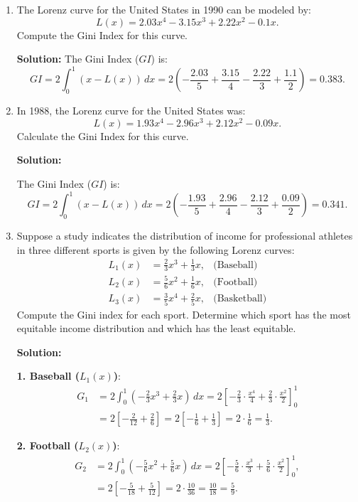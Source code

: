 \documentclass{article}
\begin{document}
\begin{enumerate}[leftmargin=0.5cm, label=\arabic*., rightmargin=0.2cm]

    \item The Lorenz curve for the United States in 1990 can be modeled by:
    \[
    L(x) = 2.03x^4 - 3.15x^3 + 2.22x^2 - 0.1x.
    \]
    Compute the Gini Index for this curve.

    \textbf{Solution:}
    The Gini Index ($GI$) is:
    \[
    GI = 2 \int_0^1 (x - L(x)) \, dx = 2 \left(-\frac{2.03}{5} + \frac{3.15}{4} - \frac{2.22}{3} + \frac{1.1}{2}\right) = 0.383.
    \]

    \item In 1988, the Lorenz curve for the United States was:
    \[
    L(x) = 1.93x^4 - 2.96x^3 + 2.12x^2 - 0.09x.
    \]
    Calculate the Gini Index for this curve.

    \textbf{Solution:}

    The Gini Index ($GI$) is:
    \[
    GI = 2 \int_0^1 (x - L(x)) \, dx = 2 \left(-\frac{1.93}{5} + \frac{2.96}{4} - \frac{2.12}{3} + \frac{0.09}{2}\right) = 0.341.
    \]

    \item Suppose a study indicates the distribution of income for professional athletes in three different sports is given by the following Lorenz curves:
    \begin{align*}
        L_1(x) &= \frac{2}{3}x^3 + \frac{1}{3}x, & \text{(Baseball)} \\
        L_2(x) &= \frac{5}{6}x^2 + \frac{1}{6}x, & \text{(Football)} \\
        L_3(x) &= \frac{3}{5}x^4 + \frac{2}{5}x, & \text{(Basketball)}
    \end{align*}
    Compute the Gini index for each sport. Determine which sport has the most equitable income distribution and which has the least equitable.

    \textbf{Solution:}

    \textbf{1. Baseball (\(L_1(x)\))}:
    \begin{align*}
        G_1 &= 2 \int_0^1 \left(-\frac{2}{3}x^3 + \frac{2}{3}x\right) \, dx = 2 \left[-\frac{2}{3} \cdot \frac{x^4}{4} + \frac{2}{3} \cdot \frac{x^2}{2}\right]_0^1 \\
        &= 2 \left[-\frac{2}{12} + \frac{2}{6}\right] = 2 \left[-\frac{1}{6} + \frac{1}{3}\right] = 2 \cdot \frac{1}{6} = \frac{1}{3}.
    \end{align*}

    \textbf{2. Football (\(L_2(x)\))}:
    \begin{align}
        G_2 &= 2 \int_0^1 \left(-\frac{5}{6}x^2 + \frac{5}{6}x\right) \, dx = 2 \left[-\frac{5}{6} \cdot \frac{x^3}{3} + \frac{5}{6} \cdot \frac{x^2}{2}\right]_0^1, \\
        &= 2 \left[-\frac{5}{18} + \frac{5}{12}\right] = 2 \cdot \frac{10}{36} = \frac{10}{18} = \frac{5}{9}.
    \end{align}


\end{enumerate}
\end{document}
